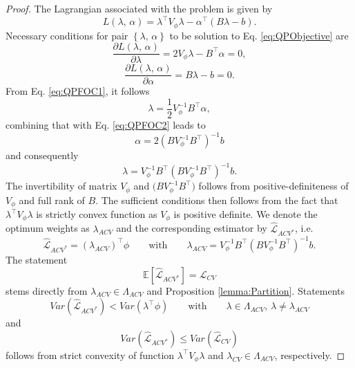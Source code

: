 \documentclass[11pt,dvipsnames]{article}
\newtheorem{proof}{Proof of Proposition}
\begin{document}
\begin{appendices}
\begin{proof}
The Lagrangian associated with the problem is given by
\begin{equation}
L(\lambda,\,\alpha)=\lambda^{\top} V_{\phi} \lambda-\alpha^{\top}(B\lambda-b).
\end{equation}
Necessary conditions for pair $ \left\lbrace \lambda,\,\alpha \right\rbrace  $ to be solution to Eq. \ref{eq:QPObjective} are 
\begin{equation}\label{eq:QPFOC1} 
\dfrac{\partial L(\lambda,\,\alpha)}{\partial \lambda}=2 V_{\phi} \lambda-B^{\top}\alpha=0,
\end{equation}
\begin{equation}\label{eq:QPFOC2} 
\dfrac{\partial L(\lambda,\,\alpha)}{\partial \alpha}=B\lambda-b=0.
\end{equation}
From Eq. \ref{eq:QPFOC1}, it follows 
\begin{equation}
\lambda=\dfrac{1}{2}V_{\phi}^{-1}B^{\top}\alpha,
\end{equation}
combining that with Eq. \ref{eq:QPFOC2} leads to
\begin{equation}
\alpha=2\left(B V_{\phi}^{-1}B^{\top} \right)^{-1}b
\end{equation}
and consequently
\begin{equation}
\lambda=V_{\phi}^{-1}B^{\top}\left( B V_{\phi}^{-1} B^{\top} \right)^{-1} b.
\end{equation}
The invertibility of matrix $ V_{\phi} $ and $ \big( B V_{\phi}^{-1} B^{\top} \big) $ follows from positive-definiteness of $ V_{\phi} $ and full rank of $ B $. The sufficient conditions then follows from the fact that $ \lambda^{\top} V_{\phi} \lambda $ is strictly convex function as $ V_{\phi} $ is positive definite. We denote the optimum weights as $ \lambda_{ACV} $ and the corresponding estimator by $ \widehat{\mathcal{L}}_{ACV^{*}} $, i.e.
\begin{equation}
\widehat{\mathcal{L}}_{ACV^{*}}=\left( \lambda_{ACV}\right)^{\top}\phi \qquad \text{with} \qquad \lambda_{ACV}= V_{\phi}^{-1}B^{\top}\left( B V_{\phi}^{-1} B^{\top} \right)^{-1} b.
\end{equation}
The statement 
\begin{equation}
\mathbb{E}[\widehat{\mathcal{L}}_{ACV^{*}}]=\mathcal{L}_{CV} 
\end{equation}
stems directly from $ \lambda_{ACV} \in \Lambda_{ACV} $ and Proposition \ref{lemma:Partition}. Statements 
\begin{equation}
Var(\widehat{\mathcal{L}}_{ACV^{*}}) < Var(\lambda^{\top}\phi) \qquad \text{with} \qquad \lambda \in \Lambda_{ACV},\, \lambda \neq \lambda_{ACV}
\end{equation}
and
\begin{equation}
Var(\widehat{\mathcal{L}}_{ACV^{*}}) \leq Var(\widehat{\mathcal{L}}_{CV})
\end{equation}
follows from strict convexity of function $ \lambda^{\top} V_{\phi} \lambda $ and $ \lambda_{CV} \in \Lambda_{ACV} $, respectively.


\end{proof}
\end{appendices}
\end{document}

